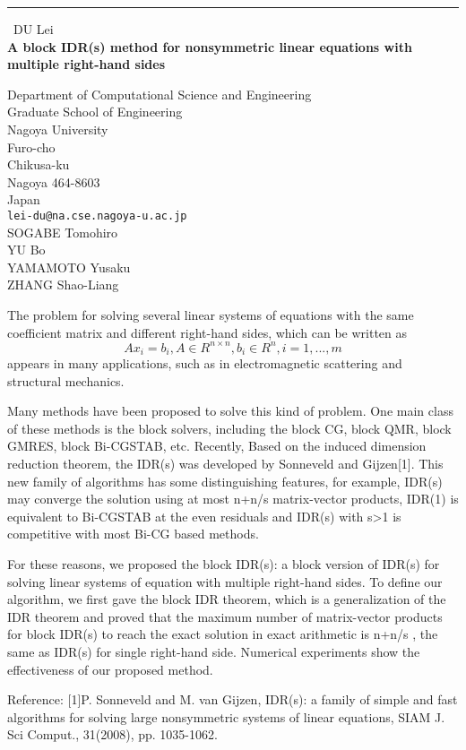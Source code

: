 \documentclass{report}
\begin{document}
\begin{center}
\rule{6in}{1pt} \
{\large DU Lei \\
{\bf A block IDR(s) method for nonsymmetric linear equations with multiple right-hand sides}}

Department of Computational Science and Engineering \\ Graduate School of Engineering \\ Nagoya University \\ Furo-cho \\ Chikusa-ku \\ Nagoya 464-8603 \\ Japan
\\
{\tt lei-du@na.cse.nagoya-u.ac.jp}\\
SOGABE Tomohiro\\
YU Bo\\
YAMAMOTO Yusaku\\
ZHANG Shao-Liang\end{center}

The problem for solving several linear systems of equations with the same
coefficient matrix and different right-hand sides, which can be written
as
\begin{equation}
Ax_i=b_i, A\in R^{n\times n}, b_i\in R^n, i=1,...,m
\end{equation}
appears in many applications, such as in electromagnetic scattering and
structural mechanics.

Many methods have been proposed to solve this kind of problem. One main
class of these methods is the block solvers, including the block CG,
block QMR, block GMRES, block Bi-CGSTAB, etc.
Recently, Based on the induced dimension reduction theorem, the IDR(s)
was developed by Sonneveld and Gijzen[1]. This new family of algorithms
has some distinguishing features, for example, IDR(s) may converge the
solution using at most n+n/s matrix-vector products, IDR(1) is equivalent
to Bi-CGSTAB at the even residuals and IDR(s) with s>1 is competitive
with most Bi-CG based methods.

For these reasons, we proposed the block IDR(s): a block version of
IDR(s) for solving linear systems of equation with multiple right-hand
sides. To define our algorithm, we first gave the block IDR theorem,
which is a generalization of the IDR theorem and proved that the maximum
number of matrix-vector products for block IDR(s) to reach the exact
solution in exact arithmetic is n+n/s , the same as IDR(s) for single
right-hand side. Numerical experiments show the effectiveness of our
proposed method.

Reference:
[1]P. Sonneveld and M. van Gijzen, IDR(s): a family of simple and fast
algorithms for solving large nonsymmetric systems of linear equations,
SIAM J. Sci Comput., 31(2008), pp. 1035-1062.
\end{document}
